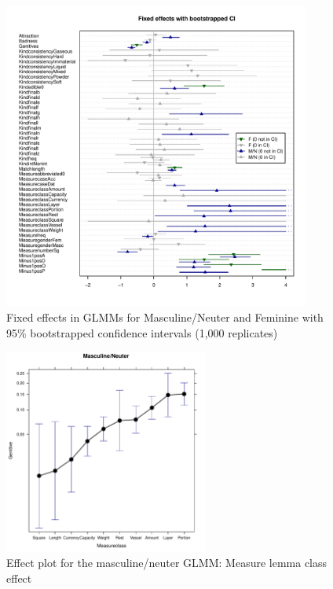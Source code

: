 \documentclass[USenglish]{article}
\begin{document}
\begin{figure}[h]
\centering
\includegraphics[width=0.9\textwidth]{figures/corpus/04_glmm_fixef.pdf}
\caption{Fixed effects in GLMMs for Masculine\slash Neuter and Feminine with 95\% bootstrapped confidence intervals (1,000 replicates)}
\label{fig:glmmfixef}
\end{figure}


\begin{figure}[h]
\centering
\includegraphics[width=0.6\textwidth]{figures/corpus/04_glmm_fixeff_mn_Measureclass}
\caption{Effect plot for the masculine\slash neuter GLMM: Measure lemma class effect}
\label{fig:glmm:fixef:measureclass}
\end{figure}
\end{document}
